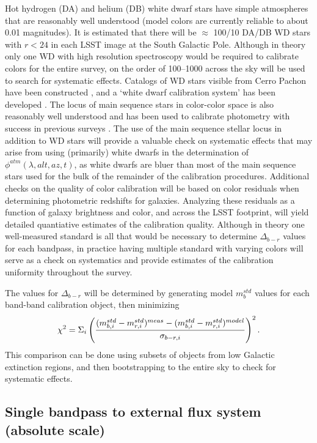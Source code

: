 \documentclass[12pt,preprint]{aastex}
\begin{document}
Hot hydrogen (DA) and helium (DB) white dwarf stars have simple
atmospheres that are reasonably well understood (model colors are
currently reliable to about 0.01 magnitudes). It is estimated that
there will be $\approx$ 100/10 DA/DB WD stars with $r<24$ in each LSST
image at the South Galactic Pole. Although in theory only one WD
with high resolution spectroscopy would be
required to calibrate colors for the entire survey, on the order of
100--1000 across the sky will be used to search for systematic effects.
Catalogs of WD stars visible from Cerro Pachon have been constructed
\citep{1992JRASC..86..309B, 2004AJ....128.3053B}, and a `white dwarf
calibration system' has been developed
\citep{2006AJ....132.1221H}. The locus of main sequence stars in
color-color space is also reasonably well understood and has been used
to calibrate photometry with success in previous surveys
\citep{2004MNRAS.352.1255M, Ivezic2007}. The use of the main
sequence stellar locus in addition to WD stars will provide a valuable
check on systematic effects that may arise from using (primarily)
white dwarfs in the determination of $\phi^{atm}(\lambda,alt,az,t)$,
as white dwarfs are bluer than most of the main sequence stars used
for the bulk of the remainder of the calibration procedures.
Additional checks on the quality of color calibration will be based on
color residuals when determining photometric redshifts for
galaxies. Analyzing these residuals as a function of galaxy brightness
and color, and across the LSST footprint, will yield detailed
quantiative estimates of the calibration quality.  Although in theory
one well-measured standard is all that would be necessary to determine
$\Delta_{b-r}$ values for each bandpass, in practice having multiple
standard with varying colors will serve as a check on systematics and
provide estimates of the calibration uniformity throughout the survey.

The values for $\Delta_{b-r}$ will be determined by generating model
$m_b^{std}$ values for each band-band calibration object, then
minimizing 
\begin{equation}
\chi^2 = \Sigma_{i} \left( { (m_{b,i}^{std} - m_{r,i}^{std})^{meas} - (m_{b,i}^{std}
    - m_{r,i}^{std})^{model} \over  \sigma_{b-r,i}}\right) ^2. 
\end{equation}
This comparison can
be done using subsets of objects from low Galactic extinction regions,
and then bootstrapping to the entire sky to check for systematic
effects. 

\subsection{Single bandpass to external flux system (absolute scale)}
\label{subsec:fluxstars}
\end{document}
